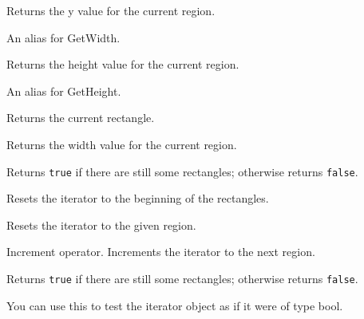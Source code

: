 Returns the y value for the current region.


\label{wxregioniteratorgetw}


An alias for GetWidth.


\label{wxregioniteratorgetheight}


Returns the height value for the current region.


\label{wxregioniteratorgeth}


An alias for GetHeight.


\label{wxregioniteratorgetrect}


Returns the current rectangle.


\label{wxregioniteratorgetwidth}


Returns the width value for the current region.


\label{wxregioniteratorhaverects}


Returns {\tt true} if there are still some rectangles; otherwise returns {\tt false}.


\label{wxregioniteratorreset}


Resets the iterator to the beginning of the rectangles.


Resets the iterator to the given region.


\label{wxregioniteratorinc}


Increment operator. Increments the iterator to the next region.



\label{wxregioniteratorbool}


Returns {\tt true} if there are still some rectangles; otherwise returns {\tt false}.

You can use this to test the iterator object as if it were of type bool.

